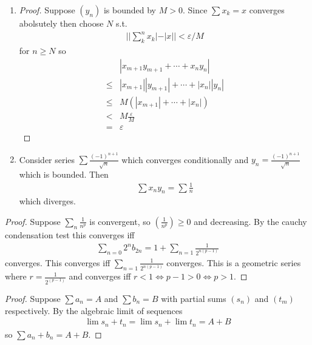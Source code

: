 \begin{enumerate}[label=(\alph*)]
    \item 
    \begin{proof}
        Suppose $(y_n)$ is bounded by $M>0$.
        Since $\sum x_k = x$ converges abolsutely then choose
        $N$ s.t.
        \begin{align*}
            ||\sum_k^n x_k| - |x|| < \varepsilon / M
        \end{align*}
        for $n \geq N$ so
        \begin{align*}
            & |x_{m+1}y_{m+1} + \cdots + x_{n}y_{n}|  \\
            \leq &|x_{m+1}||y_{m+1}| + \cdots + |x_{n}||y_{n}| \\
            \leq &M(|x_{m+1}| + \cdots + |x_{n}|) \\ 
            < &M \frac{\varepsilon}{M} \\
            = &\varepsilon 
        \end{align*} 
    \end{proof}

    \item 
    Consider series $\sum \frac{(-1)^{n+1}}{\sqrt n}$
    which converges conditionally and $y_n = \frac{(-1)^{n+1}}{\sqrt n}$
    which is bounded. Then 
    \begin{align*}
        \sum x_n y_n = \sum \frac{1}{n}
    \end{align*}
    which diverges.
\end{enumerate}

\begin{proof}
    Suppose $\sum_n \frac{1}{n^p}$ is convergent, so $(\frac{1}{n^p}) \geq 0$
    and decreasing. By the cauchy condensation test this converges iff
    \begin{align*}
        \sum_{n=0} 2^n b_{2n} = 1 + \sum_{n=1} \frac{1}{2^{n(p-1)}}
    \end{align*}
    converges. This converges iff $\sum_{n=1} \frac{1}{2^{n(p-1)}}$ converges.
    This is a geometric series where $r = \frac{1}{2^{(p-1)}}$ and converges 
    iff $r<1 \Leftrightarrow p-1>0 \Leftrightarrow p>1$.
\end{proof}

\begin{proof}
    Suppose $\sum a_n = A$ and $\sum b_n = B$ with partial sums $(s_n)$ and 
    $(t_m)$ respectively. By the algebraic limit \Thm of sequences 
    \begin{align*}
        \lim s_n + t_n = \lim s_n + \lim t_n = A+B
    \end{align*}
    so $\sum a_n + b_n = A+B$.
\end{proof}

